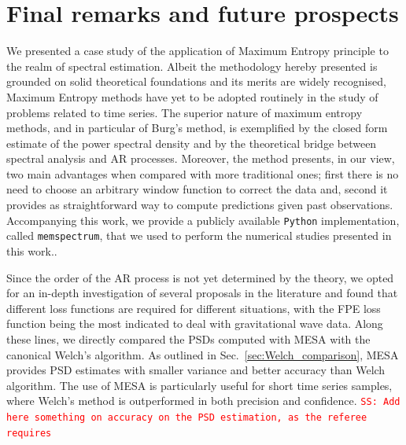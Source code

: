 \documentclass{aa}
\newcommand{\sschmidt}[1]{{\textcolor{red}{\texttt{SS: #1}} }}
\begin{document}
\section{Final remarks and future prospects} \label{sec:conclusion}
We presented a case study of the application of Maximum Entropy principle to the realm of spectral estimation. Albeit the methodology hereby presented is grounded on solid theoretical foundations and its merits are widely recognised, Maximum Entropy methods have yet to be adopted routinely in the study of problems related to time series. The superior nature of maximum entropy methods, and in particular of Burg's method, is exemplified by the closed form estimate of the power spectral density and by the theoretical bridge between spectral analysis and AR processes. Moreover, the method presents, in our view, two main advantages when compared with more traditional ones; first there is no need to choose an arbitrary window function to correct the data and, second it provides as straightforward way to compute predictions given past observations. Accompanying this work, we provide a publicly available \texttt{Python} implementation, called \texttt{memspectrum}, that we used to perform the numerical studies presented in this work.. 

Since the order of the AR process is not yet determined by the theory, we opted for an in-depth investigation of several proposals in the literature and found that different loss functions are required for different situations, with the FPE loss function being the most indicated to deal with gravitational wave data. Along these lines, we directly compared the PSDs computed with MESA with the canonical Welch's algorithm. As outlined in Sec.~\ref{sec:Welch_comparison}, MESA provides PSD estimates with smaller variance and better accuracy than Welch algorithm.
The use of MESA is particularly useful for short time series samples, where Welch's method is outperformed in both precision and confidence. \sschmidt{Add here something on accuracy on the PSD estimation, as the referee requires}
 
\end{document}

